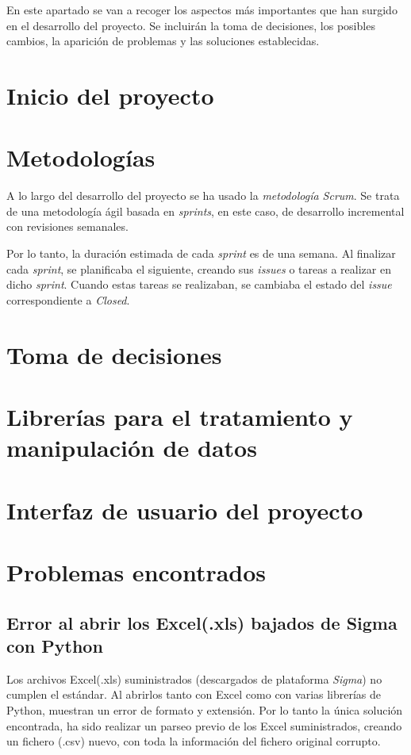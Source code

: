 
En este apartado se van a recoger los aspectos más importantes que han surgido en el desarrollo del proyecto. Se incluirán la toma de decisiones, los posibles cambios, la aparición de problemas y las soluciones establecidas.

\section{Inicio del proyecto}\label{inicio_del_proyecto}





\section{Metodologías}\label{metodologias}

A lo largo del desarrollo del proyecto se ha usado la \emph{metodología Scrum}. Se trata de una metodología ágil basada en \emph{sprints}, en este caso, de desarrollo incremental con revisiones semanales.

Por lo tanto, la duración estimada de cada \emph{sprint} es de una semana. Al finalizar cada \emph{sprint}, se planificaba el siguiente, creando sus \emph{issues} o tareas a realizar en dicho \emph{sprint}. Cuando estas tareas se realizaban, se cambiaba el estado del \emph{issue} correspondiente a \emph{Closed}.  


\section{Toma de decisiones}\label{toma_de_decisiones}


\section{Librerías para el tratamiento y manipulación de datos}\label{librerias}


\section{Interfaz de usuario del proyecto}\label{interfaz_de_usuario_del_proyecto}


\section{Problemas encontrados}
\subsection{Error al abrir los Excel(.xls) bajados de Sigma con Python}
Los archivos Excel(.xls) suministrados (descargados de plataforma \emph{Sigma}) no cumplen el estándar. Al abrirlos tanto con Excel como con varias librerías de Python, muestran un error de formato y extensión. Por lo tanto la única solución encontrada, ha sido realizar un parseo previo de los Excel suministrados, creando un fichero (.csv) nuevo, con toda la información del fichero original corrupto.

